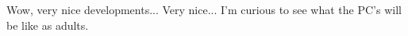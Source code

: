 Wow, very nice developments...  Very nice... I'm curious to see what the PC's will be like as adults.\\

